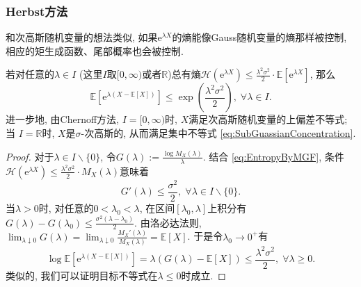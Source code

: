 \subsubsection{Herbst方法}

和次高斯随机变量的想法类似, 如果$\mathrm{e}^{\lambda X}$的熵能像Gauss随机变量的熵那样被控制, 相应的矩生成函数、尾部概率也会被控制.
\begin{theorem}[Herbst方法]\label{thm:HerbstArgument}
	若对任意的$\lambda \in I$ (这里$I$取$[0, \infty)$或者$\mathbb{R}$)总有熵$\mathcal{H}(\mathrm{e}^{\lambda X}) \leq \frac{\lambda^2 \sigma^2}{2} \cdot \mathbb{E}[\mathrm{e}^{\lambda X}]$, 那么
	\begin{equation*}
		\mathbb{E}\left[\mathrm{e}^{\lambda(X - \mathbb{E}[X])}\right] 
		\leq \exp \left( \frac{\lambda^2 \sigma^2}{2} \right),\; 
		\forall \lambda \in I. 
	\end{equation*}
	进一步地, 由Chernoff方法, $I = [0, \infty)$时, $X$满足次高斯随机变量的上偏差不等式; 当
	$I = \mathbb{R}$时, $X$是$\sigma$-次高斯的, 从而满足集中不等式 \eqref{eq:SubGuassianConcentration}.
\end{theorem}
\begin{proof}
	对于$\lambda \in I \backslash \{0\}$, 令$G(\lambda) := \frac{\log M_X(\lambda)}{\lambda}$. 
	结合 \eqref{eq:EntropyByMGF}, 条件$\mathcal{H}(\mathrm{e}^{\lambda X}) \leq \frac{\lambda^2 \sigma^2}{2} \cdot M_X(\lambda)$意味着
	\begin{equation*}
		G'(\lambda) \leq \frac{\sigma^2}{2},\; \forall \lambda \in I \backslash \{0\}. 
	\end{equation*}
	当$\lambda > 0$时, 对任意的$0 < \lambda_0 < \lambda$, 在区间$[\lambda_0, \lambda]$上积分有$G(\lambda) - G(\lambda_0) \leq \frac{\sigma^2 (\lambda - \lambda_0)}{2}$. 
	由洛必达法则, $ \lim_{\lambda \downarrow 0} G(\lambda) = \lim_{\lambda \downarrow 0} \frac{M_X'(\lambda)}{M_X(\lambda)} = \mathbb{E}[X]$. 
	于是令$\lambda_0 \to 0^+$有
	\begin{equation*}
		\log \mathbb{E}\left[\mathrm{e}^{\lambda(X - \mathbb{E}[X])}\right]
		= \lambda(G(\lambda) - \mathbb{E}[X])
		\leq \frac{\lambda^2 \sigma^2}{2} ,\; 
		\forall \lambda \geq 0. 
	\end{equation*}
	类似的, 我们可以证明目标不等式在$\lambda \leq 0$时成立. 
\end{proof}


